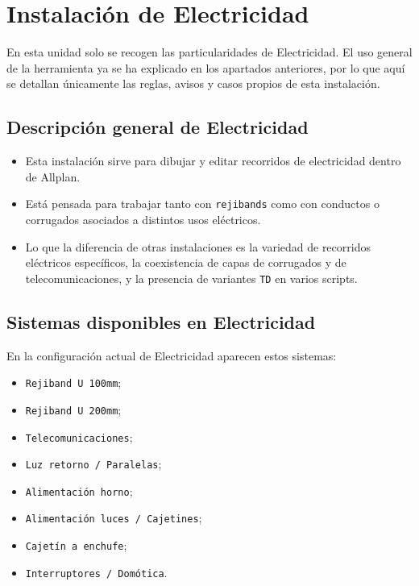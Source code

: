 ﻿\section{Instalación de Electricidad}

En esta unidad solo se recogen las particularidades de Electricidad. El uso general de la herramienta ya se ha explicado en los apartados anteriores, por lo que aquí se detallan únicamente las reglas, avisos y casos propios de esta instalación.

\subsection{Descripción general de Electricidad}

\begin{itemize}
\item Esta instalación sirve para dibujar y editar recorridos de electricidad dentro de Allplan.
\item Está pensada para trabajar tanto con \texttt{rejibands} como con conductos o corrugados asociados a distintos usos eléctricos.
\item Lo que la diferencia de otras instalaciones es la variedad de recorridos eléctricos específicos, la coexistencia de capas de corrugados y de telecomunicaciones, y la presencia de variantes \texttt{TD} en varios scripts.
\end{itemize}

\subsection{Sistemas disponibles en Electricidad}

En la configuración actual de Electricidad aparecen estos sistemas:

\begin{itemize}
\item \texttt{Rejiband U 100mm};
\item \texttt{Rejiband U 200mm};
\item \texttt{Telecomunicaciones};
\item \texttt{Luz retorno / Paralelas};
\item \texttt{Alimentación horno};
\item \texttt{Alimentación luces / Cajetines};
\item \texttt{Cajetín a enchufe};
\item \texttt{Interruptores / Domótica}.
\end{itemize}

